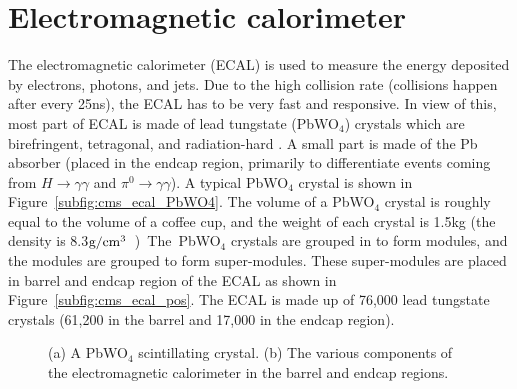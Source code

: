 \section{Electromagnetic calorimeter}
The electromagnetic calorimeter (ECAL) is used to measure the energy deposited by 
electrons, photons, and jets. Due to the high collision rate (collisions happen after 
every 25\unit{ns}), the ECAL has to be very fast and responsive. In view of this, most 
part of ECAL is made of lead tungstate (PbWO$_4$) crystals which are birefringent,
tetragonal, and radiation-hard \cite{PbWO4}. A small part is made of the Pb absorber
(placed in the endcap region, primarily to differentiate events coming from 
$H\rightarrow \gamma\gamma$ and $\pi^0 \rightarrow \gamma\gamma$). A typical PbWO$_4$ 
crystal is shown in Figure~\ref{subfig:cms_ecal_PbWO4}. The volume of a PbWO$_4$ crystal is 
roughly equal to the volume of a coffee cup, and the weight of each crystal is 1.5\unit{kg} (the 
density is 8.3\unit{$\rm g/\rm {cm}^3$}). 
The PbWO$_4$ crystals are grouped in to form modules, and the modules are grouped to form 
super-modules. These super-modules are placed in barrel and endcap region of the ECAL as 
shown in Figure~\ref{subfig:cms_ecal_pos}. The ECAL is made up of 76,000 lead tungstate 
crystals (61,200 in the barrel and 17,000 in the endcap region).
\begin{figure}
  \centering
	 \hfil
 	\caption{(a) A PbWO$_4$ scintillating crystal. (b) The various components of the 
	electromagnetic calorimeter in the barrel and endcap regions.}
 	\label{fig:cms_ecal}
\end{figure}

